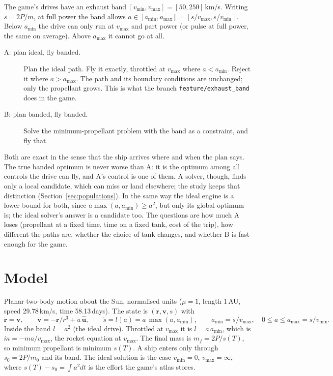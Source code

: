 \documentclass[10pt,a4paper]{article}
\begin{document}
The game's drives have an exhaust band $[v_{\min}, v_{\max}] = [50, 250]$\,km/s. Writing $s = 2P/m$, at full power
the band allows $a \in [a_{\min}, a_{\max}] = [s/v_{\max}, s/v_{\min}]$. Below $a_{\min}$ the drive can only run at
$v_{\max}$ and part power (or pulse at full power, the same on average). Above $a_{\max}$ it cannot go at all.

\begin{description}
\item[A: plan ideal, fly banded.] Plan the ideal path. Fly it exactly, throttled at $v_{\max}$ where $a < a_{\min}$.
  Reject it where $a > a_{\max}$. The path and its boundary conditions are unchanged; only the propellant grows.
  This is what the branch \texttt{feature/exhaust\_band} does in the game.
\item[B: plan banded, fly banded.] Solve the minimum-propellant problem with the band as a constraint, and fly that.
\end{description}

Both are exact in the sense that the ship arrives where and when the plan says. The true banded optimum is never
worse than A: it is the optimum among all controls the drive can fly, and A's control is one of them. A solver,
though, finds only a local candidate, which can miss or land elsewhere; the study keeps that distinction (Section~\ref{sec:populations}).
In the same way the ideal engine is a lower bound for both, since $a\max(a,a_{\min}) \ge a^2$, but only its global
optimum is; the ideal solver's answer is a candidate too. The questions are how much A loses
(propellant at a fixed time, time on a fixed tank, cost of the trip), how different the paths are, whether the
choice of tank changes, and whether B is fast enough for the game.

\section{Model}

Planar two-body motion about the Sun, normalised units ($\mu = 1$, length 1\,AU, speed 29.78\,km/s, time
58.13\,days). The state is $(\mathbf r, \mathbf v, s)$ with
\begin{equation}
\dot{\mathbf r} = \mathbf v,\qquad \dot{\mathbf v} = -\mathbf r/r^3 + a\,\hat{\mathbf u},\qquad
\dot s = l(a) = a\,\max(a, a_{\min}),\qquad a_{\min} = s/v_{\max},\quad 0 \le a \le a_{\max} = s/v_{\min}.
\end{equation}
Inside the band $l = a^2$ (the ideal drive). Throttled at $v_{\max}$ it is $l = a\,a_{\min}$, which is
$\dot m = -m a/v_{\max}$, the rocket equation at $v_{\max}$. The final mass is $m_f = 2P/s(T)$, so minimum propellant
is minimum $s(T)$. A ship enters only through $s_0 = 2P/m_0$ and its band. The ideal solution is the case
$v_{\min} = 0$, $v_{\max} = \infty$, where $s(T) - s_0 = \int a^2 dt$ is the effort the game's atlas stores.
\end{document}
